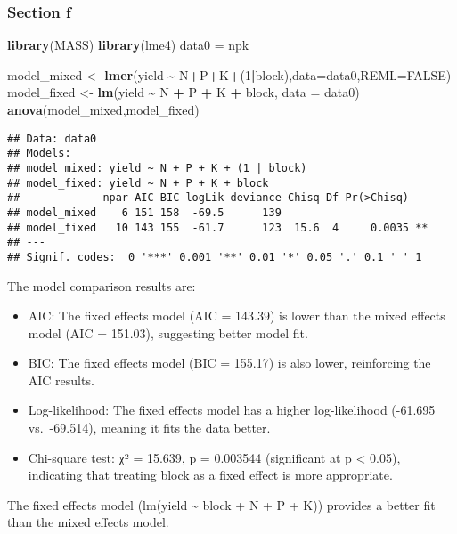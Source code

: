 \documentclass[
]{article}
\newenvironment{Shaded}{\begin{snugshade}}{\end{snugshade}}
\newcommand{\AttributeTok}[1]{\textcolor[rgb]{0.13,0.29,0.53}{#1}}
\newcommand{\ConstantTok}[1]{\textcolor[rgb]{0.56,0.35,0.01}{#1}}
\newcommand{\DecValTok}[1]{\textcolor[rgb]{0.00,0.00,0.81}{#1}}
\newcommand{\FunctionTok}[1]{\textcolor[rgb]{0.13,0.29,0.53}{\textbf{#1}}}
\newcommand{\NormalTok}[1]{#1}
\newcommand{\OtherTok}[1]{\textcolor[rgb]{0.56,0.35,0.01}{#1}}
\newcommand{\SpecialCharTok}[1]{\textcolor[rgb]{0.81,0.36,0.00}{\textbf{#1}}}
\newcommand{\StringTok}[1]{\textcolor[rgb]{0.31,0.60,0.02}{#1}}
\providecommand{\tightlist}{%
  \setlength{\itemsep}{0pt}\setlength{\parskip}{0pt}}
\begin{document}
\subsubsection{Section f}\label{section-f}

\begin{Shaded}
\begin{Highlighting}[]
\FunctionTok{library}\NormalTok{(}\StringTok{\textquotesingle{}MASS\textquotesingle{}}\NormalTok{)}
\FunctionTok{library}\NormalTok{(}\StringTok{\textquotesingle{}lme4\textquotesingle{}}\NormalTok{)}
\NormalTok{data0 }\OtherTok{=}\NormalTok{ npk}

\NormalTok{model\_mixed }\OtherTok{\textless{}{-}} \FunctionTok{lmer}\NormalTok{(yield }\SpecialCharTok{\textasciitilde{}}\NormalTok{ N}\SpecialCharTok{+}\NormalTok{P}\SpecialCharTok{+}\NormalTok{K}\SpecialCharTok{+}\NormalTok{(}\DecValTok{1}\SpecialCharTok{|}\NormalTok{block),}\AttributeTok{data=}\NormalTok{data0,}\AttributeTok{REML=}\ConstantTok{FALSE}\NormalTok{) }
\NormalTok{model\_fixed }\OtherTok{\textless{}{-}} \FunctionTok{lm}\NormalTok{(yield }\SpecialCharTok{\textasciitilde{}}\NormalTok{  N }\SpecialCharTok{+}\NormalTok{ P }\SpecialCharTok{+}\NormalTok{ K }\SpecialCharTok{+}\NormalTok{ block, }\AttributeTok{data =}\NormalTok{ data0)}
\FunctionTok{anova}\NormalTok{(model\_mixed,model\_fixed) }
\end{Highlighting}
\end{Shaded}

\begin{verbatim}
## Data: data0
## Models:
## model_mixed: yield ~ N + P + K + (1 | block)
## model_fixed: yield ~ N + P + K + block
##             npar AIC BIC logLik deviance Chisq Df Pr(>Chisq)   
## model_mixed    6 151 158  -69.5      139                       
## model_fixed   10 143 155  -61.7      123  15.6  4     0.0035 **
## ---
## Signif. codes:  0 '***' 0.001 '**' 0.01 '*' 0.05 '.' 0.1 ' ' 1
\end{verbatim}

The model comparison results are:

\begin{itemize}
\tightlist
\item
  AIC: The fixed effects model (AIC = 143.39) is lower than the mixed
  effects model (AIC = 151.03), suggesting better model fit.
\item
  BIC: The fixed effects model (BIC = 155.17) is also lower, reinforcing
  the AIC results.
\item
  Log-likelihood: The fixed effects model has a higher log-likelihood
  (-61.695 vs.~-69.514), meaning it fits the data better.
\item
  Chi-square test: χ² = 15.639, p = 0.003544 (significant at p
  \textless{} 0.05), indicating that treating block as a fixed effect is
  more appropriate.
\end{itemize}

The fixed effects model (lm(yield \textasciitilde{} block + N + P + K))
provides a better fit than the mixed effects model.
\end{document}
